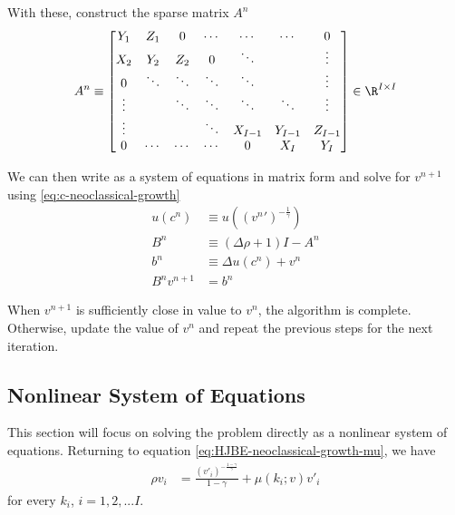 \documentclass[11pt]{etk-article}
\begin{document}
With these, construct the sparse matrix $A^n$
\begin{align}
A^n &\equiv \begin{bmatrix}
Y_1 & Z_1 & 0 & \cdots & \cdots & \cdots & 0 \\
X_2 & Y_2 & Z_2 & 0 & \ddots& & \vdots \\
0 & \ddots & \ddots & \ddots & \ddots &  & \vdots \\
\vdots & &\ddots & \ddots & \ddots & \ddots  & \vdots \\
\vdots & & & \ddots & X_{I-1} & Y_{I-1}  & Z_{I-1} \\
0 & \cdots & \cdots & \cdots & 0 & X_I & Y_I\\
\end{bmatrix}\in\R^{I\times I}\label{eq:A}\\
\end{align}


We can then write as a system of equations in matrix form and solve for $v^{n+1}$ using \cref{eq:c-neoclassical-growth}
\begin{align}
u(c^n) &\equiv u\left(\left({v^n}'\right)^{-\frac{1}{\gamma}}\right)\\
B^n &\equiv (\Delta \rho + 1)I - A^n\\
b^n &\equiv \Delta u(c^n) + v^n\\
B^{n}v^{n+1} &= {b^n}
\end{align}



When $v^{n+1}$ is sufficiently close in value to $v^n$, the algorithm is complete. Otherwise, update the value of $v^n$ and repeat the previous steps for the next iteration. 


\subsection{Nonlinear System of Equations}
This section will focus on solving the problem directly as a nonlinear system of equations. Returning to equation \cref{eq:HJBE-neoclassical-growth-mu}, we have 
\begin{align}
\rho v_i &= \frac{\left(v'_i\right)^{-\frac{1-\gamma}{\gamma}}}{1-\gamma} + \mu(k_i;v) v'_i
\end{align}
for every $k_i$, $i=1,2,...I$.


\end{document}
